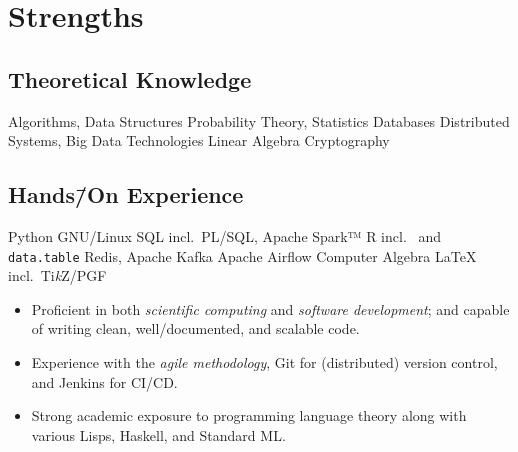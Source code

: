 \documentclass[10pt,letterpaper]{article}%
\begin{document}
\begin{minipage}[t]{.4\textwidth}
  \section{Strengths}%
  \label{sec:strengths}
  \subsection{Theoretical Knowledge}%
  \label{sec:theoretical-knowledge}
  \begin{tcbitemize}[%
    raster columns=2,%
    raster equal height=rows,%
    size=fbox,%
    halign=flush left,%
    valign=center,%
    on line,%
    rounded corners,%
    colframe=black%
    ]
    \tcbitem{}Algorithms, Data Structures%
    \tcbitem{}Probability Theory, Statistics%
    \tcbitem{}Databases%
    \tcbitem{}Distributed Systems, Big Data Technologies%
    \tcbitem{}Linear Algebra%
    \tcbitem{}Cryptography
  \end{tcbitemize}

  \subsection{%
    \texorpdfstring%
    {Hands\=/On Experience}%
    {Hands-On Experience}%
  }%
  \label{sec:hands-on-experience}
  \begin{tcbitemize}[%
    raster columns=2,%
    raster equal height=rows,%
    size=fbox,%
    halign=flush left,%
    valign=center,%
    on line,%
    rounded corners,%
    colframe=black%
    ]
    \tcbitem{}Python%
    \tcbitem{}GNU/Linux%
    \tcbitem{}SQL incl.\ PL/SQL, Apache Spark™%
    \tcbitem{}R incl.\  and \texttt{data.table}%
    \tcbitem{}Redis, Apache Kafka%
    \tcbitem{}Apache Airflow%
    \tcbitem{}Computer Algebra%
    \tcbitem{}\LaTeX{} incl.\ Ti\emph{k}Z/PGF
  \end{tcbitemize}

  \begingroup%
  \small%
  \begin{itemize}[nosep,leftmargin=*]
  \item Proficient in both \emph{scientific computing} and \emph{software
      development}; and capable of writing clean, well\-/documented, and
    scalable code.
  \item Experience with the \emph{agile methodology}, Git for (distributed)
    version control, and Jenkins for CI/CD\@.
  \item Strong academic exposure to programming language theory along with
    various Lisps, Haskell, and Standard ML\@.
  \end{itemize}
  \endgroup


\end{minipage}
\end{document}
